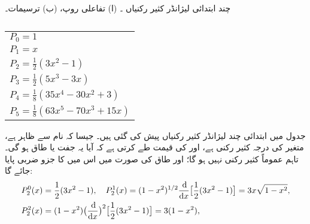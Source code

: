 \begin{table}
\caption{چند ابتدائی لیژانڈر کثیر رکنیاں ۔ (ا) تفاعلی روپ، (ب) ترسیمات۔}
\label{جدول_ابعاد_لیژانڈر_چند_ابتدائی}
\centering
\begin{subtable}{0.45\textwidth}
\centering
\begin{tabular}{l}
$P_0=1$\\[0.25em]
$P_1=x$\\[0.25em]
$P_2=\frac{1}{2}(3x^2-1)$\\[0.25em]
$P_3=\frac{1}{2}(5x^3-3x)$\\[0.25em]
$P_4=\frac{1}{8}(35x^4-30x^2+3)$\\[0.25em]
$P_5=\frac{1}{8}(63x^5-70x^3+15x)$
\end{tabular}
\caption{}
\end{subtable}\hfill
\begin{subtable}{0.45\textwidth}
\centering
{}
\caption{}
\end{subtable}
\end{table}
جدول  میں ابتدائی چند لیژانڈر کثیر رکنیاں پیش کی گئی ہیں۔ جیسا کہ نام سے ظاہر ہے،  متغیر  کی درجہ  کثیر رکنی ہے، اور  کی قیمت طے کرتی ہے کہ آیا یہ جفت یا طاق ہو گی۔ تاہم  عموماً کثیر رکنی نہیں ہو گا؛ اور طاق  کی صورت میں اس میں  کا جزو ضربی پایا جائے گا:
\begin{align*}
P_{2}^{0}(x)&=\frac{1}{2}(3x^{2}-1), \quad P_{2}^{1}(x)=(1-x^{2})^{1/2}\frac{\dif}{\dif{x}}\big[\frac{1}{2}(3x^{2}-1)\big]=3x\sqrt{1-x^{2}}, \\
P_{2}^{2}(x)&=(1-x^{2})\big(\frac{\dif}{\dif{x}}\big)^{2}\big[\frac{1}{2}(3x^{2}-1)\big]=3(1-x^{2}),
\end{align*}
